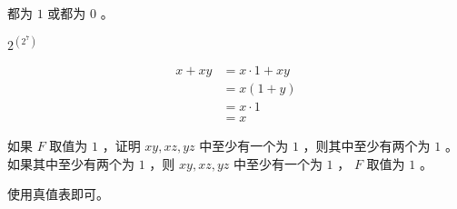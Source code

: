 {{        %
        \begin{practices}

        \end{practices}

        \begin{practices}

        \end{practices}

        \begin{practices}
            都为 $1$ 或都为 $0$ 。
        \end{practices}

        \begin{practices}
            $2^{(2^7)}$
        \end{practices}

        \begin{practices}
            \begin{align*}
                x + xy
                &= x \cdot 1 + xy \\
                &= x(1 + y) \\
                &= x \cdot 1 \\
                &= x
            \end{align*}
        \end{practices}

        \begin{practices}
            如果 $F$ 取值为 $1$ ，证明 $xy, xz, yz$ 中至少有一个为 $1$ ，则其中至少有两个为 $1$ 。
            如果其中至少有两个为 $1$ ，则 $xy, xz, yz$ 中至少有一个为 $1$ ， $F$ 取值为 $1$ 。
        \end{practices}

        \begin{practices}
            使用真值表即可。
        \end{practices}

        \begin{practices}

        \end{practices}

        \begin{practices}

        \end{practices}

        \begin{practices}


\end{practices}}}
